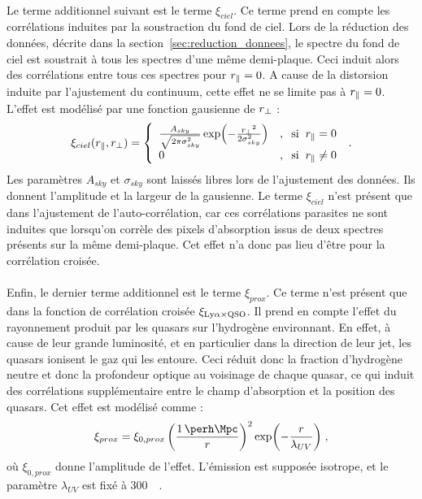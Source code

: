 \documentclass[11pt, twoside, a4paper, openright]{report}
\begin{document}
\paragraph{}
Le terme additionnel suivant est le terme $\xi_{ciel}$. Ce terme prend en compte les corrélations induites par la soustraction du fond de ciel. Lors de la réduction des données, décrite dans la section~\ref{sec:reduction_donnees}, le spectre du fond de ciel est soustrait à tous les spectres d'une même demi-plaque. Ceci induit alors des corrélations entre tous ces spectres pour $r_{\parallel}{} = 0$. A cause de la distorsion induite par l'ajustement du continuum, cette effet ne se limite pas à $r_{\parallel}{} = 0$.
L'effet est modélisé par une fonction gausienne de $r_{\perp}{}$ :
\begin{equation}
  \xi_{ciel}(r_{\parallel}{}, r_{\perp}{}) =
  \left\{
    \begin{array}{ll}
      \frac{A_{sky}}{\sqrt{2 \pi \sigma_{sky}^{2}}} \exp(- \frac{r_{\perp}{}^2}{2 \sigma_{sky}^2}) & , \hspace{0.2cm} \mathrm{si} \hspace{0.2cm} r_{\parallel}{} = 0 \\
      0 & ,  \hspace{0.2cm} \mathrm{si} \hspace{0.2cm}  r_{\parallel}{} \neq 0
    \end{array}
\right.  \; .
\end{equation}
Les paramètres $A_{sky}$ et $\sigma_{sky}$ sont laissés libres lors de l'ajustement des données. Ils donnent l'amplitude et la largeur de la gausienne.
Le terme $\xi_{ciel}$ n'est présent que dans l'ajustement de l'auto-corrélation, car ces corrélations parasites ne sont induites que lorsqu'on corrèle des pixels d'absorption issus de deux spectres présents sur la même demi-plaque. Cet effet n'a donc pas lieu d'être pour la corrélation croisée.

\paragraph{}
Enfin, le dernier terme additionnel est le terme $\xi_{prox}$. Ce terme n'est présent que dans la fonction de corrélation croisée $\xi_{\mathrm{Ly}\alpha\times\textsc{QSO}}$. Il prend en compte l'effet du rayonnement produit par les quasars sur l'hydrogène environnant. En effet, à cause de leur grande luminosité, et en particulier dans la direction de leur jet, les quasars ionisent le gaz qui les entoure. Ceci réduit donc la fraction d'hydrogène neutre et donc la profondeur optique au voisinage de chaque quasar, ce qui induit des corrélations supplémentaire entre le champ d'absorption \lya{} et la position des quasars. Cet effet est modélisé comme \autocite{Font-Ribera2013} :
\begin{equation}
  \xi_{prox} = \xi_{0,prox} \left(\frac{\SI{1}{\perh\Mpc}}{r} \right)^2 \exp( - \frac{r}{\lambda_{UV}}) \; ,
\end{equation}
où $\xi_{0,prox}$ donne l'amplitude de l'effet. L'émission est supposée isotrope, et le paramètre $\lambda_{UV}$ est fixé à \SI{300}{\perh\Mpc}.
\end{document}
